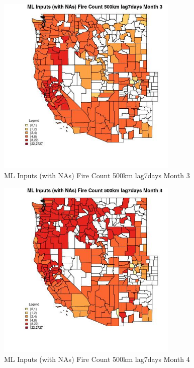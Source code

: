 \begin{figure} 
\centering  
\includegraphics[width=0.77\textwidth]{Code_Outputs/Report_ML_input_PM25_Step4_part_f_de_duplicated_aveswNAs_CountyFire_Count_500km_lag7daysmedianMonth3.jpg} 
\caption{\label{fig:Report_ML_input_PM25_Step4_part_f_de_duplicated_aveswNAsCountyFire_Count_500km_lag7daysmedianMonth3}ML Inputs (with NAs) Fire Count 500km lag7days Month 3} 
\end{figure} 
 

\begin{figure} 
\centering  
\includegraphics[width=0.77\textwidth]{Code_Outputs/Report_ML_input_PM25_Step4_part_f_de_duplicated_aveswNAs_CountyFire_Count_500km_lag7daysmedianMonth4.jpg} 
\caption{\label{fig:Report_ML_input_PM25_Step4_part_f_de_duplicated_aveswNAsCountyFire_Count_500km_lag7daysmedianMonth4}ML Inputs (with NAs) Fire Count 500km lag7days Month 4} 
\end{figure} 
 

